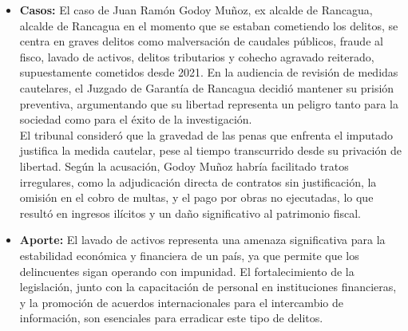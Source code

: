 \documentclass[letter,12pt]{article}
\begin{document}
\begin{itemize}
		\item \textbf{Casos: }El caso de Juan Ramón Godoy Muñoz, ex alcalde de Rancagua, alcalde de Rancagua en el momento que se estaban cometiendo los delitos, se centra en graves delitos como malversación de caudales públicos, fraude al fisco, lavado de activos, delitos tributarios y cohecho agravado reiterado, supuestamente cometidos desde 2021. En la audiencia de revisión de medidas cautelares, el Juzgado de Garantía de Rancagua decidió mantener su prisión preventiva, argumentando que su libertad representa un peligro tanto para la sociedad como para el éxito de la investigación.\\ El tribunal consideró que la gravedad de las penas que enfrenta el imputado justifica la medida cautelar, pese al tiempo transcurrido desde su privación de libertad. Según la acusación, Godoy Muñoz habría facilitado tratos irregulares, como la adjudicación directa de contratos sin justificación, la omisión en el cobro de multas, y el pago por obras no ejecutadas, lo que resultó en ingresos ilícitos y un daño significativo al patrimonio fiscal.\cite{LavadoActivos}\\
		
		\item \textbf{Aporte: }El lavado de activos representa una amenaza significativa para la estabilidad económica y financiera de un país, ya que permite que los delincuentes sigan operando con impunidad. El fortalecimiento de la legislación, junto con la capacitación de personal en instituciones financieras, y la promoción de acuerdos internacionales para el intercambio de información, son esenciales para erradicar este tipo de delitos.\\
	\end{itemize}
	
\end{document}

